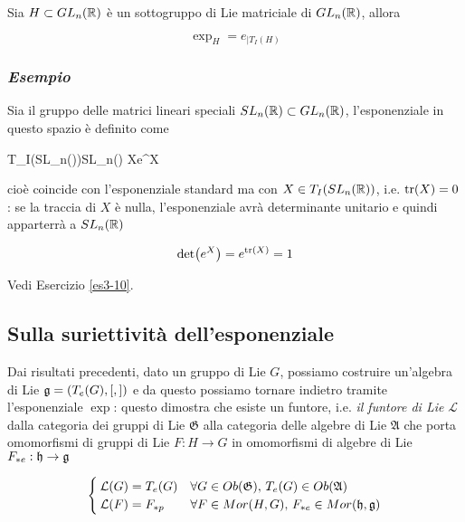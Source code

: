 \begin{corollary}
	Sia $ H \subset GL_{n}(\mathbb{R}) $ è un sottogruppo di Lie matriciale di $ GL_{n}(\mathbb{R}) $, allora
	
	\begin{equation}
		\exp_{H} = e_{| T_{I}(H)}
	\end{equation}
\end{corollary}

\subsubsection{\textit{Esempio}}

Sia il gruppo delle matrici lineari speciali $ SL_{n}(\mathbb{R}) \subset GL_{n}(\mathbb{R}) $, l'esponenziale in questo spazio è definito come

%
	{T_{I}(SL_{n}(\R))}{SL_{n}(\R)}%
	{X}{e^{X}}

cioè coincide con l'esponenziale standard ma con $ X \in T_{I}(SL_{n}(\mathbb{R})) $, i.e. $ \tr(X) = 0 $: se la traccia di $ X $ è nulla, l'esponenziale avrà determinante unitario e quindi apparterrà a $ SL_{n}(\mathbb{R}) $

\begin{equation}
	\det(e^{X}) = e^{\tr(X)} = 1
\end{equation}

Vedi Esercizio \ref{es3-10}.

\subsection{Sulla suriettività dell'esponenziale}

Dai risultati precedenti, dato un gruppo di Lie $ G $, possiamo costruire un'algebra di Lie $ \mathfrak{g} = (T_{e}(G),[,]) $ e da questo possiamo tornare indietro tramite l'esponenziale $ \exp $: questo dimostra che esiste un funtore, i.e. \textit{il funtore di Lie} $ \mathcal{L} $ dalla categoria dei gruppi di Lie $ \mathfrak{G} $ alla categoria delle algebre di Lie $ \mathfrak{A} $ che porta omomorfismi di gruppi di Lie $ F : H \to G $ in omomorfismi di algebre di Lie $ F_{*e} : \mathfrak{h} \to \mathfrak{g} $

\begin{equation}
	\begin{cases}
		\mathcal{L}(G) = T_{e}(G) & \forall G \in Ob(\mathfrak{G}), \, T_{e}(G) \in Ob(\mathfrak{A})\\
		\mathcal{L}(F) = F_{*p} & \forall F \in Mor(H,G), \, F_{*e} \in Mor(\mathfrak{h},\mathfrak{g})
	\end{cases}
\end{equation}

